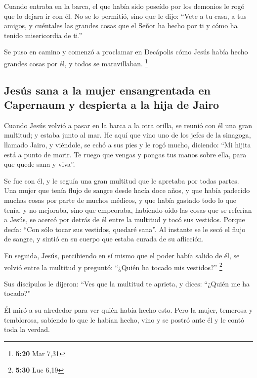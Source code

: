  Cuando entraba en la barca, el que había sido poseído
por los demonios le rogó que lo dejara ir con él.  No se
lo permitió, sino que le dijo: ``Vete a tu casa, a tus amigos, y
cuéntales las grandes cosas que el Señor ha hecho por ti y cómo ha
tenido misericordia de ti.''

 Se puso en camino y comenzó a proclamar en Decápolis
cómo Jesús había hecho grandes cosas por él, y todos se maravillaban.
\footnote{\textbf{5:20} Mar 7,31}

\hypertarget{jesuxfas-sana-a-la-mujer-ensangrentada-en-capernaum-y-despierta-a-la-hija-de-jairo}{%
\subsection{Jesús sana a la mujer ensangrentada en Capernaum y despierta
a la hija de
Jairo}\label{jesuxfas-sana-a-la-mujer-ensangrentada-en-capernaum-y-despierta-a-la-hija-de-jairo}}

 Cuando Jesús volvió a pasar en la barca a la otra
orilla, se reunió con él una gran multitud; y estaba junto al mar.
 He aquí que vino uno de los jefes de la sinagoga,
llamado Jairo, y viéndole, se echó a sus pies  y le rogó
mucho, diciendo: ``Mi hijita está a punto de morir. Te ruego que vengas
y pongas tus manos sobre ella, para que quede sana y viva''.

 Se fue con él, y le seguía una gran multitud que le
apretaba por todas partes.  Una mujer que tenía flujo de
sangre desde hacía doce años,  y que había padecido
muchas cosas por parte de muchos médicos, y que había gastado todo lo
que tenía, y no mejoraba, sino que empeoraba,  habiendo
oído las cosas que se referían a Jesús, se acercó por detrás de él entre
la multitud y tocó sus vestidos.  Porque decía: ``Con
sólo tocar sus vestidos, quedaré sana''.  Al instante se
le secó el flujo de sangre, y sintió en su cuerpo que estaba curada de
su aflicción.

 En seguida, Jesús, percibiendo en sí mismo que el poder
había salido de él, se volvió entre la multitud y preguntó: ``¿Quién ha
tocado mis vestidos?'' \footnote{\textbf{5:30} Luc 6,19}

 Sus discípulos le dijeron: ``Ves que la multitud te
aprieta, y dices: ``¿Quién me ha tocado?''

 Él miró a su alrededor para ver quién había hecho esto.
 Pero la mujer, temerosa y temblorosa, sabiendo lo que le
habían hecho, vino y se postró ante él y le contó toda la verdad.


